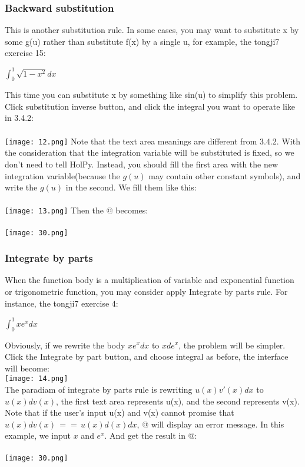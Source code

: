 \documentclass[titlepage]{article}
\makeatletter
\newcommand*{\rom}[1]{\expandafter\@slowromancap\romannumeral #1@}
\makeatother
\begin{document}
\subsubsection{Backward substitution}
This is another substitution rule. In some cases, you may want to substitute x by some g(u) rather than substitute f(x) by a single u, for example, the tongji7 exercise 15:
\begin{center}
$\int_{0}^{1} \sqrt{1 - x^2} dx$
\end{center}
This time you can substitute x by something like sin(u) to simplify this problem. Click \colorbox{mygray}{substitution inverse} button, and click the integral you want to operate like in 3.4.2:\\\\
\texttt{[image: 12.png]}
Note that the text area meanings are different from 3.4.2. With the consideration that the integration variable will be substituted is fixed, so we don't need to tell HolPy. Instead, you should fill the first area with the new integration variable(because the $g(u)$ may contain other constant symbols), and write the $g(u)$ in the second. We fill them like this:\\\\
\texttt{[image: 13.png]}
Then the \rom{3} becomes:\\\\
\texttt{[image: 30.png]}
\subsubsection{Integrate by parts}
When the function body is a multiplication of variable and exponential function or trigonometric function, you may consider apply Integrate by parts rule. For instance, the tongji7 exercise 4:
\begin{center}
$\int_{0}^{1} xe^{x} dx$
\end{center}
Obviously, if we rewrite the body $xe^{x} dx$ to $x de^{x}$, the problem will be simpler. Click the \colorbox{mygray}{Integrate by part} button, and choose integral as before, the interface will become:\\
\texttt{[image: 14.png]}\\
The paradiam of integrate by parts rule is rewriting $u(x)v'(x)dx$ to $u(x)dv(x)$, the first text area represents u(x), and the second represents v(x). Note that if the user's input u(x) and v(x) cannot promise that $u(x)dv(x)\,==\,u(x)d(x)dx$, \rom{5} will display an error message. In this example, we input $x$ and $e^{x}$. And get the result in \rom{3}:\\\\
\texttt{[image: 30.png]}\\
\end{document}
